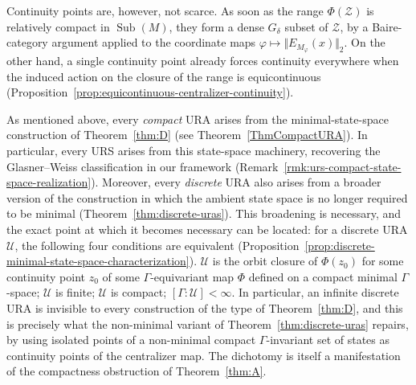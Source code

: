 \documentclass[12pt]{amsart} %
\theoremstyle{plain}
\theoremstyle{definition}
\newcommand{\Ucal}{\mathcal{U}}
\DeclareMathOperator{\Sub}{Sub}
\begin{document}
Continuity points are, however, not scarce. As soon as the range $\Phi(\mathcal Z)$ is relatively compact in $\Sub(M)$, they form a dense $G_\delta$ subset of $\mathcal Z$, by a Baire-category argument applied to the coordinate maps $\varphi\mapsto\Vert E_{M_\varphi}(x)\Vert_2$. On the other hand, a single continuity point already forces continuity everywhere when the induced action on the closure of the range is equicontinuous (Proposition~\ref{prop:equicontinuous-centralizer-continuity}).


As mentioned above, every \emph{compact} URA arises from the minimal-state-space construction of Theorem~\ref{thm:D} (see Theorem~\ref{ThmCompactURA}). In particular, every URS arises from this state-space machinery, recovering the Glasner--Weiss classification in our framework (Remark~\ref{rmk:urs-compact-state-space-realization}). Moreover, every \emph{discrete} URA also arises from a broader version of the construction in which the ambient state space is no longer required to be minimal (Theorem~\ref{thm:discrete-uras}). This broadening is necessary, and the exact point at which it becomes necessary can be located: for a discrete URA $\Ucal$, the following four conditions are equivalent (Proposition~\ref{prop:discrete-minimal-state-space-characterization}). $\Ucal$ is the orbit closure of $\Phi(z_0)$ for some continuity point $z_0$ of some $\Gamma$-equivariant map $\Phi$ defined on a compact minimal $\Gamma$-space; $\Ucal$ is finite; $\Ucal$ is compact; $[\Gamma:\Ucal]<\infty$. In particular, an infinite discrete URA is invisible to every construction of the type of Theorem~\ref{thm:D}, and this is precisely what the non-minimal variant of Theorem~\ref{thm:discrete-uras} repairs, by using isolated points of a non-minimal compact $\Gamma$-invariant set of states as continuity points of the centralizer map. The dichotomy is itself a manifestation of the compactness obstruction of Theorem~\ref{thm:A}. 
\end{document}
